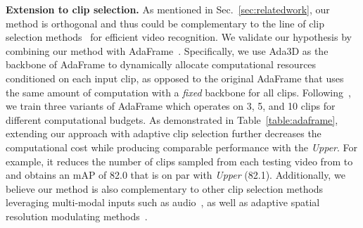 \documentclass[final]{cvpr}
\newcommand{\system}{{Ada3D}\xspace}
\begin{document}
   

\begin{table}[!t] \centering
    \vspace{-0.1in}
    \caption{\textbf{Extension to clip-level selection.} Combining \system with AdaFrame~\cite{adaframe} offers computational savings for video-level aggregation. \#\,Clip denotes number of clips used per testing video; \emph{Van} (Vanilla) and \emph{Ada} denote our method without and with AdaFrame, respectively.}
    \label{table:adaframe}
    \end{table}

    
\vspace{0.05in}
\noindent\textbf{Extension to clip selection.} As mentioned in Sec.~\ref{sec:relatedwork}, our method is orthogonal and thus could be complementary to the line of clip selection methods~\cite{marl,adaframe,scsampler,listentolook} for efficient video recognition. We validate our hypothesis by combining our method with AdaFrame~\cite{adaframe}. Specifically, we use \system as the backbone of AdaFrame to dynamically allocate computational resources conditioned on each input clip, as opposed to the original AdaFrame that uses the same amount of computation with a \emph{fixed} backbone for all clips. Following~\cite{adaframe}, we train three variants of AdaFrame which operates on 3, 5, and 10 clips for different computational budgets. As demonstrated in Table~\ref{table:adaframe}, extending our approach with adaptive clip selection further decreases the computational cost while producing comparable performance with the \emph{Upper}. For example, it reduces the number of clips sampled from each testing video from  to  and obtains an mAP of 82.0 that is on par with \emph{Upper} (82.1). Additionally, we believe our method is also complementary to other clip selection methods leveraging multi-modal inputs such as audio~\cite{scsampler,listentolook}, as well as adaptive spatial resolution modulating methods~\cite{arnet,whenandwhere,huanggaoresolution}.
\end{document}
